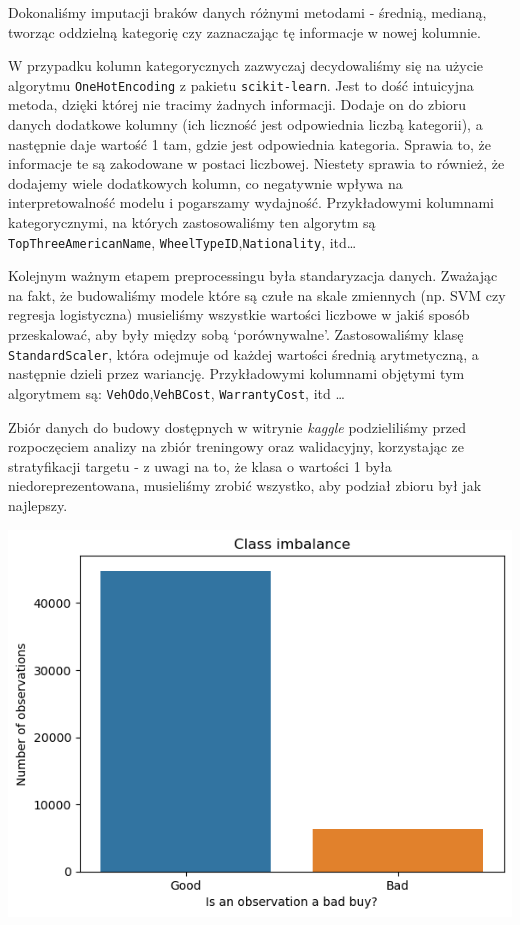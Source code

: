 \documentclass[11pt]{article}
\begin{document}
Dokonaliśmy imputacji braków danych różnymi metodami - średnią, medianą,
tworząc oddzielną kategorię czy zaznaczając tę informacje w nowej
kolumnie.

W przypadku kolumn kategorycznych zazwyczaj decydowaliśmy się na użycie
algorytmu \texttt{OneHotEncoding} z pakietu \texttt{scikit-learn}. Jest
to dość intuicyjna metoda, dzięki której nie tracimy żadnych informacji.
Dodaje on do zbioru danych dodatkowe kolumny (ich liczność jest
odpowiednia liczbą kategorii), a następnie daje wartość 1 tam, gdzie
jest odpowiednia kategoria. Sprawia to, że informacje te są zakodowane w
postaci liczbowej. Niestety sprawia to również, że dodajemy wiele
dodatkowych kolumn, co negatywnie wpływa na interpretowalność modelu i
pogarszamy wydajność. Przykładowymi kolumnami kategorycznymi, na których
zastosowaliśmy ten algorytm są \texttt{TopThreeAmericanName},
\texttt{WheelTypeID},\texttt{Nationality}, itd\ldots{}

Kolejnym ważnym etapem preprocessingu była standaryzacja danych.
Zważając na fakt, że budowaliśmy modele które są czułe na skale
zmiennych (np. SVM czy regresja logistyczna) musieliśmy wszystkie
wartości liczbowe w jakiś sposób przeskalować, aby były między sobą
`porównywalne'. Zastosowaliśmy klasę \texttt{StandardScaler}, która
odejmuje od każdej wartości średnią arytmetyczną, a następnie dzieli
przez wariancję. Przykładowymi kolumnami objętymi tym algorytmem są:
\texttt{VehOdo},\texttt{VehBCost}, \texttt{WarrantyCost}, itd \ldots{}

Zbiór danych do budowy dostępnych w witrynie \emph{kaggle} podzieliliśmy
przed rozpoczęciem analizy na zbiór treningowy oraz walidacyjny,
korzystając ze stratyfikacji targetu - z uwagi na to, że klasa o
wartości 1 była niedoreprezentowana, musieliśmy zrobić wszystko, aby
podział zbioru był jak najlepszy.

\includegraphics{plots/class imbalance.png}
\end{document}
